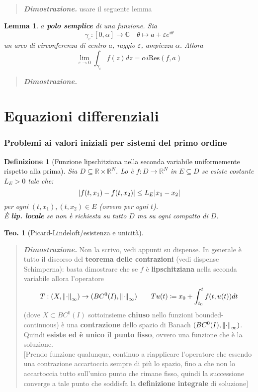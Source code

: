 \documentclass[a4paper,10pt]{article}
\newcommand{\re}{\mathbb{R}} %
\newcommand{\im}{\mathbb{C}} %
\theoremstyle{indentdefinition}
\newtheorem{defn}{Definizione}[section]
\theoremstyle{indenttheorem}
\newtheorem{thm}{Teo.}
\newtheorem{lem}{Lemma}
\theoremstyle{myremark}
\theoremstyle{indentgeneral}
\newenvironment{dimo}{\begin{quote}\textit{\textbf{Dimostrazione.}}}{\end{quote}} %
\begin{document}
\begin{dimo}
    usare il seguente lemma
\end{dimo}
\begin{lem}
    $a$\textbf{ polo semplice} di una funzione. Sia 
    $$\gamma_\varepsilon:[0,\alpha]\to\im \quad \theta\mapsto a+ \varepsilon e^{i\theta}$$
    un arco di circonferenza di centro $a$, raggio $\varepsilon$, ampiezza $\alpha$. Allora
    $$\lim_{\varepsilon\to0}\int_{\gamma_\varepsilon}f(z)dz=\alpha i \text{Res}(f,a)$$
    \end{lem}
    \begin{dimo}
        
    \end{dimo}


\newpage
\part{Equazioni differenziali}
\section{Problemi ai valori iniziali per sistemi del primo ordine}
\begin{defn}[Funzione lipschitziana nella seconda variabile uniformemente rispetto alla prima]
    Sia $D\subseteq \re\times\re^N$. Lo è $f:D\to\re^N$ in $E\subseteq D$ se esiste costante $L_E>0$ tale che:
    $$\abs{f(t,x_1)-f(t,x_2)} \le L_E\abs{x_1-x_2}$$
    per ogni $(t,x_1),(t,x_2)\in E$ (ovvero per ogni $t$). \\
    È \textbf{lip. locale} se non è richiesta su tutto $D$ ma su ogni compatto di $D$.
\end{defn}
\begin{thm}[Picard-Lindeloft/esistenza e unicità]
    
\end{thm}

\begin{dimo}
    Non la scrivo, vedi appunti su dispense. In generale è tutto il discorso del \textbf{teorema delle contrazioni} (vedi dispense Schimperna): basta dimostrare che se $f$ è \textbf{lipschitziana} nella seconda variabile allora l'operatore 
    $$T: (X, \norm{\cdot}_{\infty})\to (BC^0(I), \norm{\cdot}_{\infty}) \quad\quad Tu(t)\coloneqq x_0+\int_{t_0}^tf(t,u(t))dt$$
    (dove $X\subset  BC^0(I)$ sottoinsieme \textbf{chiuso} nello funzioni bounded-continuous) è una \textbf{contrazione} dello spazio di Banach $(BC^0(I), \norm{\cdot}_{\infty})$. Quindi \textbf{esiste ed è unico il punto fisso}, ovvero una funzione che è la soluzione. \\
    $[$Prendo funzione qualunque, continuo a riapplicare l'operatore che essendo una contrazione accartoccia sempre di più lo spazio, fino a che non lo accartoccia tutto sull'unico punto che rimane fisso, quindi la successione converge a tale punto che soddisfa la \textbf{definizione integrale} di soluzione$]$
\end{dimo}
\end{document}
